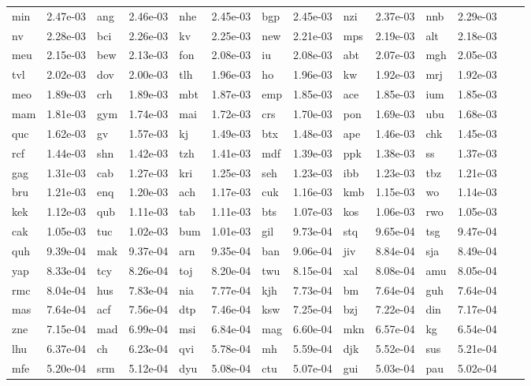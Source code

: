 \begin{table}
\begin{tabular}{ll|ll|ll|ll|ll|ll|ll}
min & 2.47e-03 & ang & 2.46e-03 & nhe & 2.45e-03 & bgp & 2.45e-03 & nzi & 2.37e-03 & nnb & 2.29e-03 \\
nv & 2.28e-03 & bci & 2.26e-03 & kv & 2.25e-03 & new & 2.21e-03 & mps & 2.19e-03 & alt & 2.18e-03 \\
meu & 2.15e-03 & bew & 2.13e-03 & fon & 2.08e-03 & iu & 2.08e-03 & abt & 2.07e-03 & mgh & 2.05e-03 \\
tvl & 2.02e-03 & dov & 2.00e-03 & tlh & 1.96e-03 & ho & 1.96e-03 & kw & 1.92e-03 & mrj & 1.92e-03 \\
meo & 1.89e-03 & crh & 1.89e-03 & mbt & 1.87e-03 & emp & 1.85e-03 & ace & 1.85e-03 & ium & 1.85e-03 \\
mam & 1.81e-03 & gym & 1.74e-03 & mai & 1.72e-03 & crs & 1.70e-03 & pon & 1.69e-03 & ubu & 1.68e-03 \\
quc & 1.62e-03 & gv & 1.57e-03 & kj & 1.49e-03 & btx & 1.48e-03 & ape & 1.46e-03 & chk & 1.45e-03 \\
rcf & 1.44e-03 & shn & 1.42e-03 & tzh & 1.41e-03 & mdf & 1.39e-03 & ppk & 1.38e-03 & ss & 1.37e-03 \\
gag & 1.31e-03 & cab & 1.27e-03 & kri & 1.25e-03 & seh & 1.23e-03 & ibb & 1.23e-03 & tbz & 1.21e-03 \\
bru & 1.21e-03 & enq & 1.20e-03 & ach & 1.17e-03 & cuk & 1.16e-03 & kmb & 1.15e-03 & wo & 1.14e-03 \\
kek & 1.12e-03 & qub & 1.11e-03 & tab & 1.11e-03 & bts & 1.07e-03 & kos & 1.06e-03 & rwo & 1.05e-03 \\
cak & 1.05e-03 & tuc & 1.02e-03 & bum & 1.01e-03 & gil & 9.73e-04 & stq & 9.65e-04 & tsg & 9.47e-04 \\
quh & 9.39e-04 & mak & 9.37e-04 & arn & 9.35e-04 & ban & 9.06e-04 & jiv & 8.84e-04 & sja & 8.49e-04 \\
yap & 8.33e-04 & tcy & 8.26e-04 & toj & 8.20e-04 & twu & 8.15e-04 & xal & 8.08e-04 & amu & 8.05e-04 \\
rmc & 8.04e-04 & hus & 7.83e-04 & nia & 7.77e-04 & kjh & 7.73e-04 & bm & 7.64e-04 & guh & 7.64e-04 \\
mas & 7.64e-04 & acf & 7.56e-04 & dtp & 7.46e-04 & ksw & 7.25e-04 & bzj & 7.22e-04 & din & 7.17e-04 \\
zne & 7.15e-04 & mad & 6.99e-04 & msi & 6.84e-04 & mag & 6.60e-04 & mkn & 6.57e-04 & kg & 6.54e-04 \\
lhu & 6.37e-04 & ch & 6.23e-04 & qvi & 5.78e-04 & mh & 5.59e-04 & djk & 5.52e-04 & sus & 5.21e-04 \\
mfe & 5.20e-04 & srm & 5.12e-04 & dyu & 5.08e-04 & ctu & 5.07e-04 & gui & 5.03e-04 & pau & 5.02e-04 \\

\end{tabular}
\end{table}

